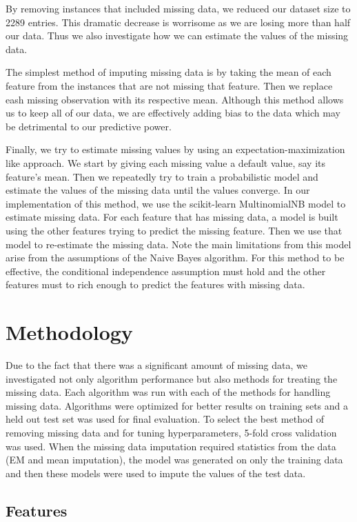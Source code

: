 \documentclass{acm_proc_article-sp}
\begin{document}
	By removing instances that included missing data, we reduced our dataset size to 2289 entries. This dramatic decrease is worrisome as we are losing more than half our data. Thus we also investigate how we can estimate the values of the missing data.

	The simplest method of imputing missing data is by taking the mean of each feature from the instances that are not missing that feature. Then we replace eash missing observation with its respective mean. Although this method allows us to keep all of our data, we are effectively adding bias to the data which may be detrimental to our predictive power.
	
	Finally, we try to estimate missing values by using an expectation-maximization like approach. We start by giving each missing value a default value, say its feature's mean. Then we repeatedly try to train a probabilistic model and estimate the values of the missing data until the values converge. In our implementation of this method, we use the scikit-learn MultinomialNB model to estimate missing data. For each feature that has missing data, a model is built using the other features trying to predict the missing feature. Then we use that model to re-estimate the missing data. Note the main limitations from this model arise from the assumptions of the Naive Bayes algorithm. For this method to be effective, the conditional independence assumption must hold and the other features must to rich enough to predict the features with missing data.
	
\section{Methodology}
	
	Due to the fact that there was a significant amount of missing data, we investigated not only algorithm performance but also methods for treating the missing data. Each algorithm was run with each of the methods for handling missing data. Algorithms were optimized for better results on training sets and a held out test set was used for final evaluation. To select the best method of removing missing data and for tuning hyperparameters, 5-fold cross validation was used. When the missing data imputation required statistics from the data (EM and mean imputation), the model was generated on only the training data and then these models were used to impute the values of the test data.
	
\subsection{Features}
	
\end{document}
